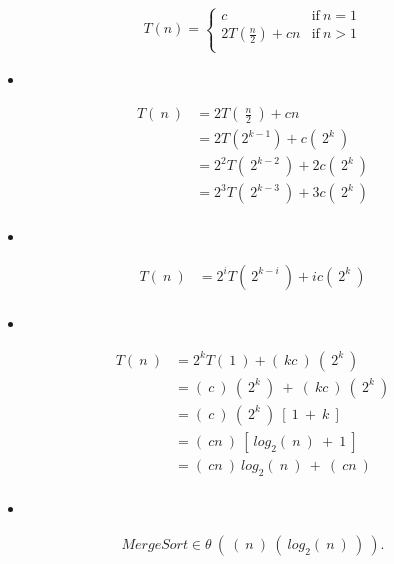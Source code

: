 \begin{ceqn}
\begin{align}
T( n ) = \left\{
\begin{array}{ll}
c & \mathrm {if\ } n = 1 \\
2T ( \frac{n}{2} ) + cn & \mathrm {if\ } n > 1 \\
\end{array}
\right.
\end{align}
\end{ceqn} \hfill

\begin{itemize}
\item {\bfseries\itshape{}}
\end{itemize} \hfill

\begin{ceqn}
\begin{align}
T (\ n\ ) &= 2T (\ \frac{n}{2}\ ) + cn \\
&= 2T ( 2^{k-1} ) + c(\ 2^{k}\ ) \\
&= 2^{2}T (\ 2^{k-2}\ ) + 2c(\ 2^{k}\ ) \\
&= 2^{3}T (\ 2^{k-3}\ ) + 3c(\ 2^{k}\ ) \\
\end{align}
\end{ceqn} \hfill

\begin{itemize}
\item {\bfseries\itshape\color{Violet}{Then:}}
\end{itemize} \hfill

\begin{ceqn}
\begin{align}
T (\ n\ ) &= 2^{i}T (\ 2^{k-i}\ ) + ic(\ 2^{k}\ ) \\
\end{align}
\end{ceqn} 

\pagebreak

\begin{itemize}
\item {\bfseries\itshape\color{Violet}{Let k - i = 0, then k = i:}}
\end{itemize} \hfill

\begin{ceqn}
\begin{align}
T (\ n\ ) &= 2^{k}T (\ 1\ ) + (\ kc\ )\ (\ 2^{k}\ ) \\
&= (\ c\ )\ (\ 2^{k}\ )\ +\ (\ kc\ )\ (\ 2^{k}\ ) \\
&= (\ c\ )\ (\ 2^{k}\ )\ [\ 1\ +\ k\ ] \\
&= (\ cn\ )\ [\ log_{2}(\ n\ )\ +\ 1\ ] \\
&= (\ cn\ )\ log_{2}(\ n\ )\ +\ (\ cn\ ) \\
\end{align}
\end{ceqn} \hfill

\begin{itemize}
\item {\bfseries\itshape\color{Violet}{Finally:}}
\end{itemize} \hfill

\begin{ceqn}
\begin{align}
MergeSort \in \theta\ (\ (\ n\ )\ (\ log_{2} (\ n\ )\ )\ ).
\end{align}
\end{ceqn}

\pagebreak